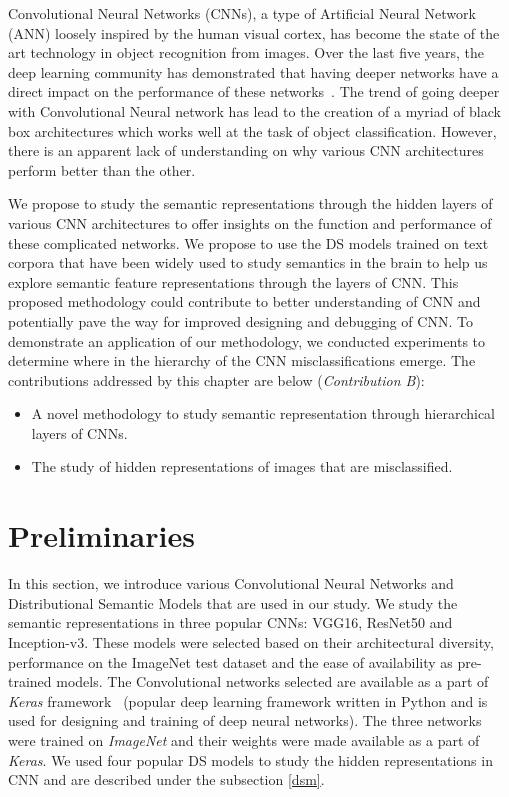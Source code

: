 \label{chapter:Exp}


Convolutional Neural Networks (CNNs), a type of Artificial Neural Network (ANN) loosely inspired by the human visual cortex, has become the state of the art technology in object recognition from images. Over the last five years, the deep learning community has demonstrated that having deeper networks have a direct impact on the performance of these networks~\cite{VGG16,ResNet,Inception-v3}. The trend of going deeper with Convolutional Neural network has lead to the creation of a myriad of black box architectures which works well at the task of object classification. However, there is an apparent lack of understanding on why various CNN architectures perform better than the other.

We propose to study the semantic representations through the hidden layers of various CNN architectures to offer insights on the function and performance of these complicated networks. We propose to use the DS models trained on text corpora that have been widely used to study semantics in the brain to help us explore semantic feature representations through the layers of CNN. This proposed methodology could contribute to better understanding of CNN and potentially pave the way for improved designing and debugging of CNN. To demonstrate an application of our methodology, we conducted experiments to determine where in the hierarchy of the CNN misclassifications emerge. The contributions addressed by this chapter are below (\textit{Contribution B}):

\begin{itemize}
\item{A novel methodology to study semantic representation through hierarchical layers of CNNs.}
\item{The study of hidden representations of images that are misclassified.}
\end{itemize}

\section{Preliminaries}
In this section, we introduce various Convolutional Neural Networks and Distributional Semantic Models that are used in our study. We study the semantic representations in three popular CNNs: VGG16, ResNet50 and Inception-v3. These models were selected based on their architectural diversity, performance on the ImageNet test dataset \cite{ImageNet2009} and the ease of availability as pre-trained models. The Convolutional networks selected are available as a part of \textit{Keras} framework~\cite{chollet2015keras} (popular deep learning framework written in Python and is used for designing and training of deep neural networks). The three networks were trained on \textit{ImageNet} and their weights were made available as a part of \textit{Keras}. We used four popular DS models to study the hidden representations in CNN and are described under the subsection \ref{dsm}.
